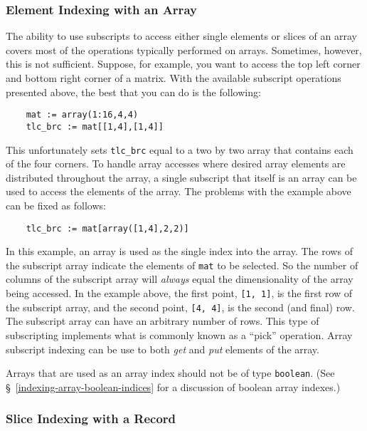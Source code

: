 \subsubsection{Element Indexing with an Array}
\label{indexing-array-elements-array}

The ability to use subscripts to access either single elements or slices of
an array covers most of the operations typically performed on arrays. Sometimes,
however, this is not sufficient. Suppose, for example, you want to 
access the
top left corner and bottom right corner of a matrix. With the available
subscript operations presented above, the best that you can do is the following:
\begin{verbatim}
    mat := array(1:16,4,4)
    tlc_brc := mat[[1,4],[1,4]]
\end{verbatim}
This unfortunately sets {\tt tlc\_brc} equal to a two by two array that 
contains each of the four corners. To handle array accesses where desired
array elements are distributed throughout the array, a single subscript
that itself is an array can be used to access the elements of the array.
The problems with the example above can be fixed as follows:
\begin{verbatim}
    tlc_brc := mat[array([1,4],2,2)]
\end{verbatim}
In this example, an array is used as the single index into the array.
The rows of the subscript array indicate the elements of {\tt mat} to
be selected. So the number of columns of the subscript array will
{\em always} equal the dimensionality of the array being accessed. In
the example above, the first point, {\tt [1, 1]}, is the first row of
the subscript array, and the second point, {\tt [4, 4]}, is the second
(and final) row. The subscript array can have an arbitrary number of rows.
This type of subscripting implements what is commonly known as a
``pick'' operation. Array subscript indexing can be use to both
{\em get} and {\em put} elements of the array.

Arrays that are used as an array index should not be of type {\tt boolean}.
(See \S~\ref{indexing-array-boolean-indices} for a discussion of boolean
array indexes.)

\subsubsection{Slice Indexing with a Record}
\label{indexing-array-elements-record}

